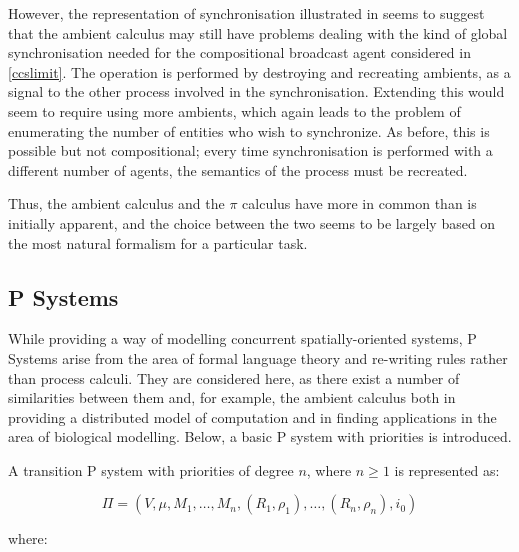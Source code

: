 However, the representation of synchronisation illustrated in \cite{amb}
seems to suggest that the ambient calculus may still have problems
dealing with the kind of global synchronisation needed for the
compositional broadcast agent considered in \ref{ccslimit}.  The
operation is performed by destroying and recreating ambients, as a
signal to the other process involved in the synchronisation.  Extending
this would seem to require using more ambients, which again leads to the
problem of enumerating the number of entities who wish to synchronize.
As before, this is possible but not compositional; every time
synchronisation is performed with a different number of agents, the
semantics of the process must be recreated.

Thus, the ambient calculus and the $\pi$ calculus have more in common
than is initially apparent, and the choice between the two seems to be
largely based on the most natural formalism for a particular task.

\subsection{P Systems}
\label{psystems}

While providing a way of modelling concurrent spatially-oriented
systems, P Systems \cite*{membranecomp,membranehandbook} arise from
the area of formal language theory and re-writing rules rather than
process calculi.  They are considered here, as there exist a number of
similarities between them and, for example, the ambient calculus both
in providing a distributed model of computation and in finding
applications in the area of biological modelling.  Below, a basic P
system with priorities is introduced.

A transition P system with priorities \cite{paun:98membranes} of
degree $n$, where $n \ge 1$ is represented as:

\begin{equation}
\Pi = (V, \mu, M_1, \dots, M_n,(R_1,\rho_1), \dots, (R_n,\rho_n),i_0)
\end{equation}

\noindent where:


